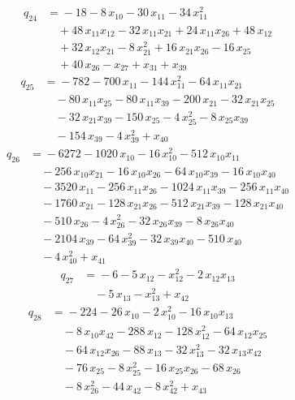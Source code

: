 \begin{align*}
q_{24} &={}-18 -8\,x_{10} -30\,x_{11} -34\,x_{11}^{2}\\
&\quad +48\,x_{11}x_{12} -32\,x_{11}x_{21} +24\,x_{11}x_{26} +48\,x_{12}\\
&\quad +32\,x_{12}x_{21} -8\,x_{21}^{2} +16\,x_{21}x_{26} -16\,x_{25}\\
&\quad +40\,x_{26} -x_{27} +x_{31} +x_{39}
\end{align*}
\begin{align*}
q_{25} &={}-782 -700\,x_{11} -144\,x_{11}^{2} -64\,x_{11}x_{21}\\
&\quad -80\,x_{11}x_{25} -80\,x_{11}x_{39} -200\,x_{21} -32\,x_{21}x_{25}\\
&\quad -32\,x_{21}x_{39} -150\,x_{25} -4\,x_{25}^{2} -8\,x_{25}x_{39}\\
&\quad -154\,x_{39} -4\,x_{39}^{2} +x_{40}
\end{align*}
\begin{align*}
q_{26} &={}-6272 -1020\,x_{10} -16\,x_{10}^{2} -512\,x_{10}x_{11}\\
&\quad -256\,x_{10}x_{21} -16\,x_{10}x_{26} -64\,x_{10}x_{39} -16\,x_{10}x_{40}\\
&\quad -3520\,x_{11} -256\,x_{11}x_{26} -1024\,x_{11}x_{39} -256\,x_{11}x_{40}\\
&\quad -1760\,x_{21} -128\,x_{21}x_{26} -512\,x_{21}x_{39} -128\,x_{21}x_{40}\\
&\quad -510\,x_{26} -4\,x_{26}^{2} -32\,x_{26}x_{39} -8\,x_{26}x_{40}\\
&\quad -2104\,x_{39} -64\,x_{39}^{2} -32\,x_{39}x_{40} -510\,x_{40}\\
&\quad -4\,x_{40}^{2} +x_{41}
\end{align*}
\begin{align*}
q_{27} &={}-6 -5\,x_{12} -x_{12}^{2} -2\,x_{12}x_{13}\\
&\quad -5\,x_{13} -x_{13}^{2} +x_{42}
\end{align*}
\begin{align*}
q_{28} &={}-224 -26\,x_{10} -2\,x_{10}^{2} -16\,x_{10}x_{13}\\
&\quad -8\,x_{10}x_{42} -288\,x_{12} -128\,x_{12}^{2} -64\,x_{12}x_{25}\\
&\quad -64\,x_{12}x_{26} -88\,x_{13} -32\,x_{13}^{2} -32\,x_{13}x_{42}\\
&\quad -76\,x_{25} -8\,x_{25}^{2} -16\,x_{25}x_{26} -68\,x_{26}\\
&\quad -8\,x_{26}^{2} -44\,x_{42} -8\,x_{42}^{2} +x_{43}
\end{align*}
